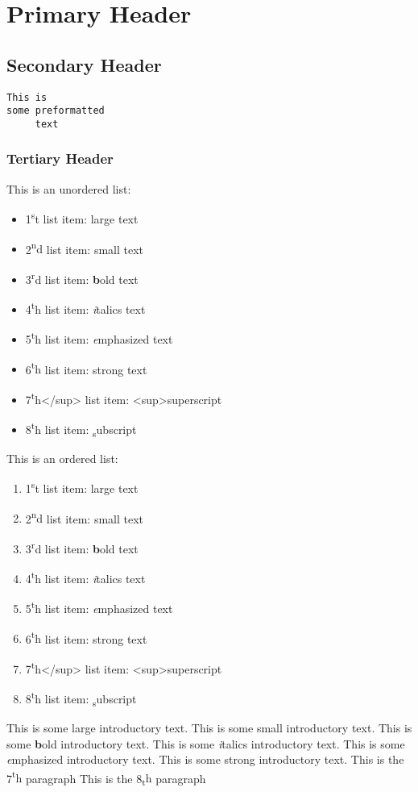 \documentclass[12pt]{article}
\begin{document}
\section{Primary Header}\subsection{Secondary Header}\begin{verbatim}This is
some preformatted
     text\end{verbatim}\subsubsection{Tertiary Header}This is an unordered list:
\begin{itemize}
\item 1{\textsuperscript st} list item: {\Large large text}
\item 2{\textsuperscript nd} list item: {\scriptsize small text}
\item 3{\textsuperscript rd} list item: {\textbf bold text}
\item 4{\textsuperscript th} list item: {\textit italics text}
\item 5{\textsuperscript th} list item: {\emph emphasized text}
\item 6{\textsuperscript th} list item: {\textmd strong text}
\item 7{\textsuperscript th</sup> list item: <sup>superscript}
\item 8{\textsuperscript th} list item: {\textsubscript subscript}
\end{itemize}
This is an ordered list:
\begin{enumerate}
\item 1{\textsuperscript st} list item: {\Large large text}
\item 2{\textsuperscript nd} list item: {\scriptsize small text}
\item 3{\textsuperscript rd} list item: {\textbf bold text}
\item 4{\textsuperscript th} list item: {\textit italics text}
\item 5{\textsuperscript th} list item: {\emph emphasized text}
\item 6{\textsuperscript th} list item: {\textmd strong text}
\item 7{\textsuperscript th</sup> list item: <sup>superscript}
\item 8{\textsuperscript th} list item: {\textsubscript subscript}
\end{enumerate}
This is some {\Large large introductory} text.
This is some {\scriptsize small introductory} text.
This is some {\textbf bold introductory} text.
This is some {\textit italics introductory} text.
This is some {\emph emphasized introductory} text.
This is some {\textmd strong introductory} text.
This is the 7{\textsuperscript th} paragraph
This is the 8{\textsubscript th} paragraph
\end{document}
